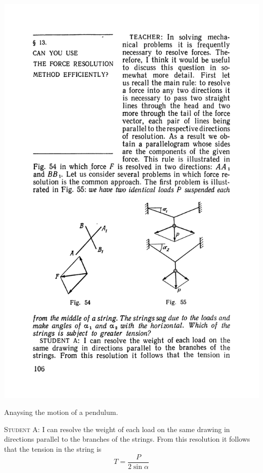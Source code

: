 \documentclass[a4paper,sfsidenotes]{tufte-book}
\begin{document}
\begin{marginfigure}
\centering
\includegraphics[width=0.8\linewidth]{fig-055a.pdf}
\caption{Anaysing the motion of a pendulum.}
\label{fig-55}
\end{marginfigure}
\textsc{Student A:} I can resolve the weight of each load on the same drawing in directions parallel to the branches of the strings. From this resolution it follows that the tension in the string is \\
\begin{equation*}
T=\frac{P}{2 \sin \alpha}
\end{equation*}
\end{document}
